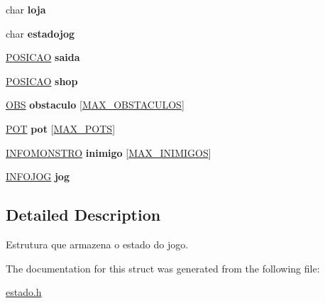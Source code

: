 \begin{DoxyCompactItemize}
\item 
char {\bfseries loja}\hypertarget{structestado_af34f09221a52ccbbf117abbbafd4129f}{}\label{structestado_af34f09221a52ccbbf117abbbafd4129f}

\item 
char {\bfseries estadojog}\hypertarget{structestado_a0a0f83a2b459641d0519526a45892f23}{}\label{structestado_a0a0f83a2b459641d0519526a45892f23}

\item 
\hyperlink{estado_8h_a55b3f4b56938eeb8fa5e8f9c07baf1b0}{P\+O\+S\+I\+C\+AO} {\bfseries saida}\hypertarget{structestado_aca05b4bb64bbb53c0dab2dc61971ed91}{}\label{structestado_aca05b4bb64bbb53c0dab2dc61971ed91}

\item 
\hyperlink{estado_8h_a55b3f4b56938eeb8fa5e8f9c07baf1b0}{P\+O\+S\+I\+C\+AO} {\bfseries shop}\hypertarget{structestado_a2e8bd5fe3f501a74f8cc278726d9ecd3}{}\label{structestado_a2e8bd5fe3f501a74f8cc278726d9ecd3}

\item 
\hyperlink{structobstaculos}{O\+BS} {\bfseries obstaculo} \mbox{[}\hyperlink{estado_8h_ac574e2817856ecc9a890d2d47cb9d783}{M\+A\+X\+\_\+\+O\+B\+S\+T\+A\+C\+U\+L\+OS}\mbox{]}\hypertarget{structestado_ad8a32319bc685b79eb96332ca7693aed}{}\label{structestado_ad8a32319bc685b79eb96332ca7693aed}

\item 
\hyperlink{estado_8h_a322294e34bb64b88d677db6172b21458}{P\+OT} {\bfseries pot} \mbox{[}\hyperlink{estado_8h_a9b11a510b6af9e4ff4d8d7c01cf33d17}{M\+A\+X\+\_\+\+P\+O\+TS}\mbox{]}\hypertarget{structestado_a2f913532eb40a296c03720d69d0d7f29}{}\label{structestado_a2f913532eb40a296c03720d69d0d7f29}

\item 
\hyperlink{estado_8h_a209ff6f7e9f27e5eaead1e6db81cba3c}{I\+N\+F\+O\+M\+O\+N\+S\+T\+RO} {\bfseries inimigo} \mbox{[}\hyperlink{estado_8h_aa97e6cbfdd94711688f1176cb8dd916a}{M\+A\+X\+\_\+\+I\+N\+I\+M\+I\+G\+OS}\mbox{]}\hypertarget{structestado_a993d9b4d9996edd5e8310b198f6a30e1}{}\label{structestado_a993d9b4d9996edd5e8310b198f6a30e1}

\item 
\hyperlink{estado_8h_a57859e4c4483e8cd888d4e2adeb36db6}{I\+N\+F\+O\+J\+OG} {\bfseries jog}\hypertarget{structestado_a2fad6d9b40818f08c6d0d09c34916be1}{}\label{structestado_a2fad6d9b40818f08c6d0d09c34916be1}

\end{DoxyCompactItemize}


\subsection{Detailed Description}
Estrutura que armazena o estado do jogo. 

The documentation for this struct was generated from the following file\+:\begin{DoxyCompactItemize}
\item 
\hyperlink{estado_8h}{estado.\+h}\end{DoxyCompactItemize}
